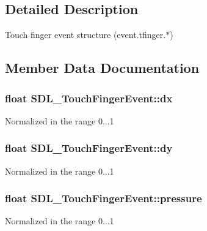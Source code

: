 \subsection{Detailed Description}
Touch finger event structure (event.\+tfinger.$\ast$) 

\subsection{Member Data Documentation}
\hypertarget{struct_s_d_l___touch_finger_event_ac6acac209d6e2bd659fdb6760081393d}{}
\subsubsection[{dx}]{\setlength{\rightskip}{0pt plus 5cm}float S\+D\+L\+\_\+\+Touch\+Finger\+Event\+::dx}\label{struct_s_d_l___touch_finger_event_ac6acac209d6e2bd659fdb6760081393d}
Normalized in the range 0...1 \hypertarget{struct_s_d_l___touch_finger_event_a9c0320c5f18a6b9d10da657e166608c9}{}
\subsubsection[{dy}]{\setlength{\rightskip}{0pt plus 5cm}float S\+D\+L\+\_\+\+Touch\+Finger\+Event\+::dy}\label{struct_s_d_l___touch_finger_event_a9c0320c5f18a6b9d10da657e166608c9}
Normalized in the range 0...1 \hypertarget{struct_s_d_l___touch_finger_event_ab4fca822d0807b5748dbae8d3cc56524}{}
\subsubsection[{pressure}]{\setlength{\rightskip}{0pt plus 5cm}float S\+D\+L\+\_\+\+Touch\+Finger\+Event\+::pressure}\label{struct_s_d_l___touch_finger_event_ab4fca822d0807b5748dbae8d3cc56524}
Normalized in the range 0...1 \hypertarget{struct_s_d_l___touch_finger_event_ad7a6f39ec9af1bf47b160d18314edd70}{}
